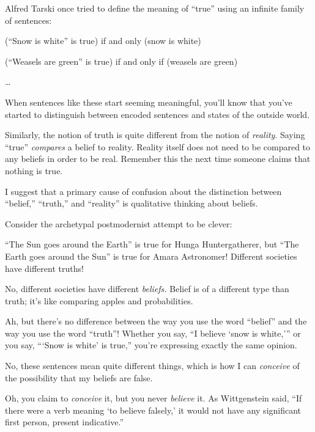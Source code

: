 {
 Alfred Tarski once tried to define the meaning of
``true'' using an infinite family of
sentences:}

{\centering
 (``Snow is white'' is true) if
and only (snow is white)
\par}


\bigskip

{\centering
 (``Weasels are green'' is true)
if and only if (weasels are green)
\par}


\bigskip

{\centering
 \ldots
\par}


\bigskip

{
 When sentences like these start seeming meaningful,
you'll know that you've started to
distinguish between encoded sentences and states of the outside world.}

{
 Similarly, the notion of truth is quite different from the notion
of \textit{reality}. Saying ``true''
\textit{compares} a belief to reality. Reality itself does not need to
be compared to any beliefs in order to be real. Remember this the next
time someone claims that nothing is true.}

\myendsectiontext


{
 I suggest that a primary cause of confusion about the distinction
between ``belief,''
``truth,'' and
``reality'' is qualitative thinking
about beliefs. }

{
 Consider the archetypal postmodernist attempt to be clever:}

{
 ``The Sun goes around the
Earth'' is true for Hunga Huntergatherer, but
``The Earth goes around the Sun'' is
true for Amara Astronomer! Different societies have different truths!}

{
 No, different societies have different \textit{beliefs.} Belief is
of a different type than truth; it's like comparing
apples and probabilities.}

{
 Ah, but there's no difference between the way you
use the word ``belief'' and the way
you use the word ``truth''! Whether
you say, ``I believe `snow is
white,''' or you say,
```Snow is white' is
true,'' you're expressing exactly the
same opinion.}

{
 No, these sentences mean quite different things, which is how I
can \textit{conceive} of the possibility that my beliefs are false.}

{
 Oh, you claim to \textit{conceive} it, but you never
\textit{believe} it. As Wittgenstein said, ``If there
were a verb meaning `to believe
falsely,' it would not have any significant first
person, present indicative.''}

